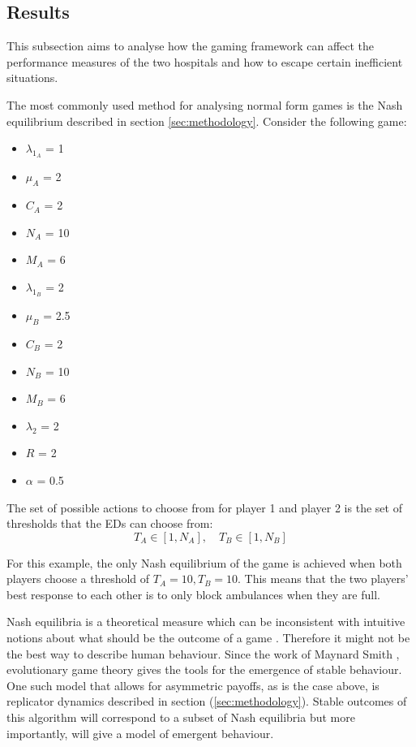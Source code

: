 \subsection{Results}\label{sec:numerical_results}

This subsection aims to analyse how the gaming framework can affect the 
performance measures of the two hospitals and how to escape certain inefficient 
situations.

The most commonly used method for analysing normal form games is the Nash 
equilibrium described in section \ref{sec:methodology}.
Consider the following game:

\begin{multicols}{3}
    \begin{itemize}
        \item \( \lambda_{1_A} \) = 1
        \item \( \mu_A \) = 2
        \item \( C_A \) = 2
        \item \( N_A \) = 10
        \item \( M_A \) = 6
        \columnbreak

        \item \( \lambda_{1_B} \) = 2
        \item \( \mu_B \) = 2.5
        \item \( C_B \) = 2
        \item \( N_B \) = 10
        \item \( M_B \) = 6
        \columnbreak

        \item \( \lambda_2 \) = 2
        \item \( R \) = 2
        \item \( \alpha \) = 0.5
    \end{itemize}
\end{multicols}

The set of possible actions to choose from for player 1 and player 2 is the
set of thresholds that the EDs can choose from: 
\begin{equation}
    T_A \in [1, N_A], \quad T_B \in [1, N_B]
\end{equation}

For this example, the only Nash equilibrium of the game is achieved when both 
players choose a threshold of \( T_A = 10, T_B = 10 \).
This means that the two players' best response to each other is to only block
ambulances when they are full. 

Nash equilibria is a theoretical measure which can be
inconsistent with intuitive notions about what should be the outcome of a 
game \cite{myerson1978refinements}.
Therefore it might not be the best way to describe human behaviour.
Since the work of Maynard Smith \cite{smith1986evolutionary}, evolutionary game 
theory gives the tools for the emergence of stable behaviour.
One such model that allows for asymmetric payoffs, as is the case above, is 
replicator dynamics described in section 
(\ref{sec:methodology}).
Stable outcomes of this algorithm will correspond to a subset of Nash
equilibria but more importantly, will give a model of emergent behaviour. 


